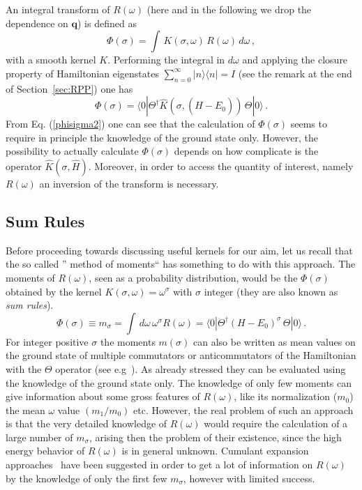 An integral transform of $R(\omega)$ (here and in the following we drop the dependence on $\mathbf{q}$) is defined as
\begin{equation}\label{phisigma1}
 \Phi(\sigma)=\int\, K(\sigma,\omega)\,R(\omega) \,d\omega\,,
\end{equation}
with a smooth kernel $K$. Performing the integral in $d\omega$ and applying 
the closure property of Hamiltonian eigenstates 
$\sum_{n=0}^\infty |n\rangle\langle n|=I$  (see the remark at the end of Section~\ref{sec:RPP}) one has
\begin{equation}\label{phisigma2}
\Phi(\sigma)=\langle 0|\Theta^\dagger\hat{K}\left(\sigma,(\hat{H}-E_0)\right)\,\Theta|0\rangle\,.
\end{equation}
From Eq. (\ref{phisigma2}) one can see that the calculation of $\Phi(\sigma)$ seems to require in principle the knowledge of the ground state 
only. However, the possibility to actually calculate $\Phi(\sigma)$ depends on how complicate is the operator $\hat{K}(\sigma,\hat{H})$. 
Moreover, in order to access the quantity of interest, namely $R(\omega)$ an inversion of the transform is necessary.

\subsection{Sum Rules}\label{SR}

Before proceeding towards discussing useful kernels for our aim, let us recall that the so called '' method of moments`` 
has something to do with this approach. The moments of $R(\omega)$, seen as a probability distribution, would be the 
$\Phi(\sigma)$ obtained by the kernel $ K(\sigma,\omega)=\omega^\sigma$ with $\sigma$ integer (they are also known as {\it sum rules}). 
\begin{equation}\label{sumrule}
\Phi(\sigma)\equiv m_\sigma=\int \, d\omega\, \omega^\sigma R(\omega) = \langle 0|\Theta^\dagger (H-E_0)^\sigma\,\Theta|0\rangle\,.
\end{equation}
For integer positive $\sigma$ the moments $m(\sigma)$ can also be written as mean values on the ground state of multiple commutators or 
anticommutators of the Hamiltonian with the $\Theta $ operator (see e.g~\cite{OTrep}). 
As already stressed they can be evaluated using the knowledge of 
the ground state only. The knowledge of only few moments can give information about some gross features of $R(\omega)$, like
its normalization ($m_0$) the mean $\omega$ value $(m_1/m_0)$ etc. However, the real problem 
of such an approach is that the very detailed knowledge of $R(\omega)$ would require the calculation of a large number 
of $m_\sigma$, arising then the problem of their existence, since the high energy behavior of $R(\omega)$ is in general 
unknown. Cumulant expansion approaches~\cite{Rosenf:1980} have been suggested in order to get a lot of information on $R(\omega)$ 
by the knowledge of only the first few $m_\sigma$, however with limited success.

